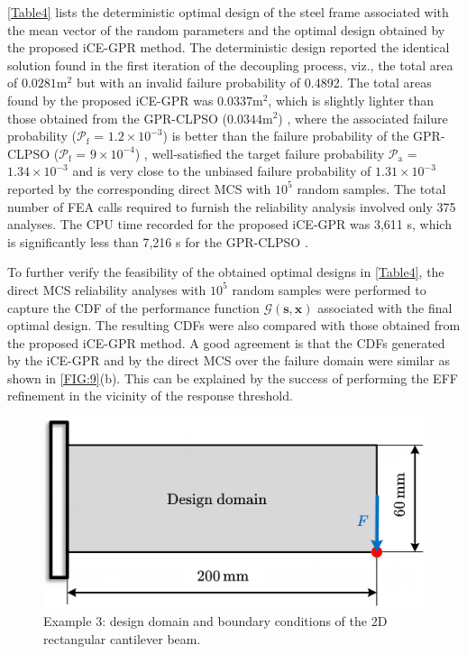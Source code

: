 \documentclass[preprint,3p]{elsarticle}
\begin{document}
\begin{linenumbers}
\cref{Table4} lists the deterministic optimal design of the steel frame associated with the mean vector of the random parameters and the optimal design obtained by the proposed iCE-GPR method. The deterministic design reported the identical solution found in the first iteration of the decoupling process, viz., the total area of $0.0281\text{m}^2$ but with an invalid failure probability of 0.4892. The total areas found by the proposed iCE-GPR was $0.0337\text{m}^2$, which is slightly lighter than those obtained from the GPR-CLPSO ($0.0344\text{m}^2$) \cite{VANHUYNH2023}, where the associated failure probability ($\mathcal{P}_\text{f}$ = $1.2\times10^{-3}$) is better than the failure probability of the GPR-CLPSO ($\mathcal{P}_\text{f}$ = $9\times10^{-4}$) \cite{VANHUYNH2023}, well-satisfied the target failure probability $\mathcal{P}_\text{a}$ = $1.34\times10^{-3}$ and is very close to the unbiased failure probability of $1.31\times10^{-3}$ reported by the corresponding direct MCS with $10^5$ random samples. The total number of FEA calls required to furnish the reliability analysis involved only 375 analyses. The CPU time recorded for the proposed iCE-GPR was 3,611 s, which is significantly less than 7,216 s for the GPR-CLPSO \cite{VANHUYNH2023}. 

To further verify the feasibility of the obtained optimal designs in \cref{Table4}, the direct MCS reliability analyses with $10^5$ random samples were performed to capture the CDF of the performance function $\mathcal{G}(\textbf{s},\textbf{x})$ associated with the final optimal design. The resulting CDFs were also compared with those obtained from the proposed iCE-GPR method. A good agreement is that the CDFs generated by the iCE-GPR and by the direct MCS over the failure domain were similar as shown in \cref{FIG:9}(b). This can be explained by the success of performing the EFF refinement in the vicinity of the response threshold.

\begin{figure}[t]
	\begin{center}
		\includegraphics[scale=0.6]{Fig10.jpg}
	\end{center}
	\caption{Example 3: design domain and boundary conditions of the 2D rectangular cantilever beam.}
	\label{FIG:10}
\end{figure}


\end{linenumbers}
\end{document}
